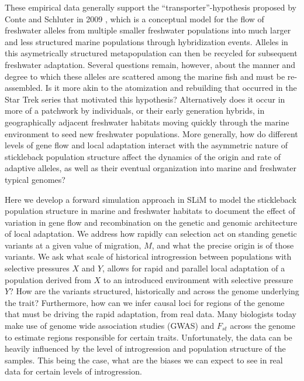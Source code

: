 \documentclass{article}
\begin{document}
These empirical data generally support the ``transporter''-hypothesis proposed by Conte and Schluter in 2009 \citet{schluter2009genetics}, which is a conceptual model for the flow of freshwater alleles from multiple smaller freshwater populations into much larger and less structured marine populations through hybridization events. Alleles in this asymetrically structured metapopulation can then be recycled for subsequent freshwater adaptation. Several questions remain, however, about the manner and degree to which these alleles are scattered among the marine fish and must be re-assembled. Is it more akin to the atomization and rebuilding that occurred in the Star Trek series that motivated this hypothesis? Alternatively does it occur in more of a patchwork by individuals, or their early generation hybrids, in geographically adjacent freshwater habitats moving quickly through the marine environment to seed new freshwater populations. More generally, how do different levels of gene flow and local adaptation interact with the asymmetric nature of stickleback population structure affect the dynamics of the origin and rate of adaptive alleles, as well as their eventual organization into marine and freshwater typical genomes? 

Here we develop a forward simulation approach in SLiM to model the stickleback population structure in marine and freshwater habitats to document the effect of variation in gene flow and recombination on the genetic and genomic architecture of local adaptation. We address how rapidly can selection act on standing genetic variants at a given value of migration, $M$, and what the precise origin is of those variants. We ask what scale of historical introgression between populations with selective pressures $X$ and $Y$, allows for rapid and parallel local adaptation of a population derived from $X$ to an introduced environment with selective pressure $Y$? How are the variants structured, historically and across the genome underlying the trait? Furthermore, how can we infer causal loci for regions of the genome that must be driving the rapid adaptation, from real data. Many biologists today make use of genome wide association studies (GWAS) and $F_{st}$ across the genome to estimate regions responsible for certain traits. Unfortunately, the data can be heavily influenced by the level of introgression and population structure of the samples. This being the case, what are the biases we can expect to see in real data for certain levels of introgression. 
\end{document}
